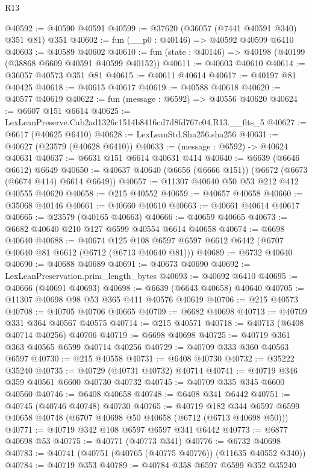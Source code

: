 \begin{lexlean}{R13}
\begin{coremodule}
@40592 := @40590 @40591
@40599 := @37620 (@36057 (@7441 @40591 @340) @351 @81) @351
@40602 := fun (__p0 : @40146) => @40592 @40599 @6410
@40603 := @40589 @40602
@40610 := fun (state : @40146) => @40198 (@40199 (@38868 @6609 @40591 @40599 @40152))
@40611 := @40603 @40610
@40614 := @36057 @40573 @351 @81
@40615 := @40611 @40614
@40617 := @40197 @81 @40425
@40618 := @40615 @40617
@40619 := @40588 @40618
@40620 := @40577 @40619
@40622 := fun (message : @6592) => @40556 @40620
@40624 := @6607 @151 @6614
@40625 := LexLeanPreserve.Cab2ad1326c1514b8416cd7d8fd767c04.R13.__fits_5
@40627 := @6617 (@40625 @6410)
@40628 := LexLeanStd.Sha256.sha256
@40631 := @40627 (@23579 (@40628 @6410))
@40633 := (message : @6592) -> @40624 @40631
@40637 := @6631 @151 @6614 @40631 @414
@40640 := @6639 (@6646 @6612) @6649
@40650 := @40637 @40640 (@6656 (@6666 @151)) (@6672 (@6673 (@6674 @414) @6614 @6649))
@40657 := @11307 @40640 @50 @53 @212 @412 @40555 @40620
@40658 := @215 @40552
@40659 := @40657 @40658
@40660 := @35068 @40146
@40661 := @40660 @40610
@40663 := @40661 @40614 @40617
@40665 := @23579 (@40165 @40663)
@40666 := @40659 @40665
@40673 := @6682 @40640 @210 @127 @6599 @40554 @6614 @40658
@40674 := @6698 @40640
@40688 := @40674
    @125
    @108
    @6597
    @6597
    @6612
    @6442
    (@6707 @40640 @81 @6612 (@6712 (@6713 @40640 @81)))
@40689 := @6732 @40640
@40690 := @40688 @40689
@40691 := @40673 @40690
@40692 := LexLeanPreservation.prim_length_bytes
@40693 := @40692 @6410
@40695 := @40666 (@40691 @40693)
@40698 := @6639 (@6643 @40658) @40640
@40705 := @11307 @40698 @98 @53 @365 @411 @40576 @40619
@40706 := @215 @40573
@40708 := @40705 @40706 @40665
@40709 := @6682 @40698
@40713 := @40709 @331 @364 @40567 @40575
@40714 := @215 @40571
@40718 := @40713 (@6408 @40714 @40256) @40706
@40719 := @6698 @40698
@40725 := @40719 @361 @363 @40565 @6599 @40714 @40256
@40729 := @40709 @333 @360 @40563 @6597
@40730 := @215 @40558
@40731 := @6408 @40730
@40732 := @35222 @35240
@40735 := @40729 (@40731 @40732) @40714
@40741 := @40719 @346 @359 @40561 @6600 @40730 @40732
@40745 := @40709 @335 @345 @6600 @40560
@40746 := @6408 @40658
@40748 := @6408 @341 @6442
@40751 := @40745 (@40746 @40748) @40730
@40765 := @40719
    @182
    @344
    @6597
    @6599
    @40658
    @40748
    (@6707 @40698 @50 @40658 (@6712 (@6713 @40698 @50)))
@40771 := @40719 @342 @108 @6597 @6597 @341 @6442
@40773 := @6877 @40698 @53
@40775 := @40771 (@40773 @341)
@40776 := @6732 @40698
@40783 := @40741 (@40751 (@40765 (@40775 @40776)) (@11635 @40552 @340))
@40784 := @40719 @353
@40789 := @40784 @358 @6597 @6599 @352 @35240

\end{coremodule}
\end{lexlean}
